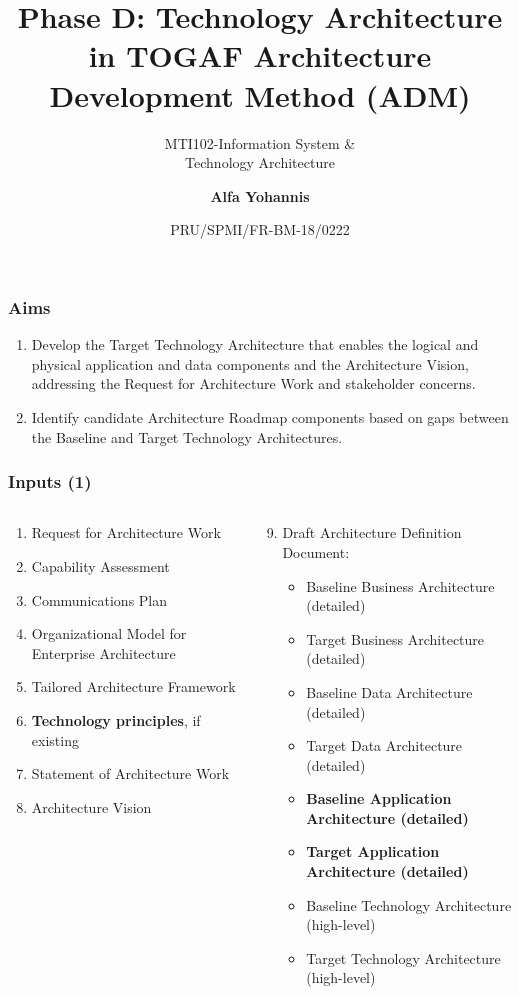 \documentclass[aspectratio=169, table]{beamer}
\subtitle{MTI102-Information System \&\\Technology Architecture}
\title{\vskip-0.7cm \Large Phase D: Technology Architecture\\in TOGAF Architecture\\Development Method (ADM)}
\date[Serial]{\scriptsize {PRU/SPMI/FR-BM-18/0222}}
\author[Pradita]{\small {\textbf{Alfa Yohannis}}}
\begin{document}
	
	\frame{\titlepage}
	
	\begin{frame}
		\frametitle{Aims}
		\begin{enumerate}
			\item Develop the Target Technology Architecture that enables the logical and physical application and data components and the Architecture Vision, addressing the Request for Architecture Work and stakeholder concerns.
			\item Identify candidate Architecture Roadmap components based on gaps between the Baseline and Target Technology Architectures.
		\end{enumerate}
	\end{frame}
	
	\begin{frame}
		\frametitle{Inputs (1)}
		\vspace{20pt}
		\begin{columns}[onlytextwidth]
			\begin{column}{0.45\textwidth}
				\begin{enumerate}
					\item Request for Architecture Work
					\item Capability Assessment
					\item Communications Plan
					\item Organizational Model for Enterprise Architecture
					\item Tailored Architecture Framework
					\item \textbf{Technology principles}, if existing
					\item Statement of Architecture Work
					\item Architecture Vision
				\end{enumerate}
			\end{column}
			\begin{column}{0.55\textwidth}
				\begin{enumerate}
					\setcounter{enumi}{8}
					\item Draft Architecture Definition Document:
					\begin{itemize}
						\item Baseline Business Architecture (detailed)
						\item Target Business Architecture (detailed)
						\item Baseline Data Architecture (detailed)
						\item Target Data Architecture (detailed)
						\item \textbf{Baseline Application Architecture (detailed)}
						\item \textbf{Target Application Architecture (detailed)}
						\item Baseline Technology Architecture (high-level)
						\item Target Technology Architecture (high-level)
					\end{itemize}
				\end{enumerate}
			\end{column}
		\end{columns}
	\end{frame}
	
\end{document}
